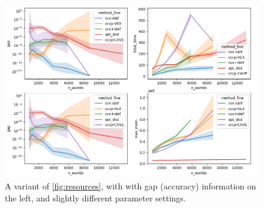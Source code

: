 \begin{subappendices}
 \begin{figure}
     \includegraphics[height=0.45\textheight]{figs/1}
     \caption{
         A variant of \cref{fig:resources}, with
         with gap (accuracy) information on the left, and slightly different parameter settings.
     }\label{fig:gap-resource-fine-old}
 \end{figure}


\end{subappendices}
